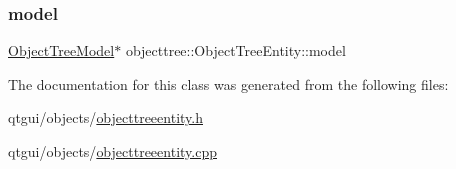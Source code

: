 \subsubsection{\texorpdfstring{model}{model}}
{\footnotesize\ttfamily \mbox{\hyperlink{class_object_tree_model}{Object\+Tree\+Model}}$\ast$ objecttree\+::\+Object\+Tree\+Entity\+::model\hspace{0.3cm}{\ttfamily [protected]}}



The documentation for this class was generated from the following files\+:\begin{DoxyCompactItemize}
\item 
qtgui/objects/\mbox{\hyperlink{objecttreeentity_8h}{objecttreeentity.\+h}}\item 
qtgui/objects/\mbox{\hyperlink{objecttreeentity_8cpp}{objecttreeentity.\+cpp}}\end{DoxyCompactItemize}
